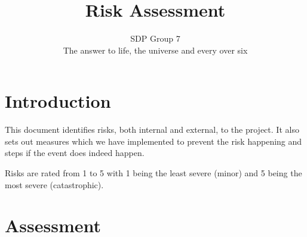 \documentclass{article}
\begin{document}
\title{Risk Assessment}
\author{SDP Group 7\\
The answer to life, the universe and every over six
}
\maketitle

\section{Introduction}

This document identifies risks, both internal and external, to the project. It
also sets out measures which we have implemented to prevent the risk
happening and steps if the event does indeed happen.

Risks are rated from 1 to 5 with 1 being the least severe (minor) and 5 being
the most severe (catastrophic).

\section{Assessment}
\end{document}
